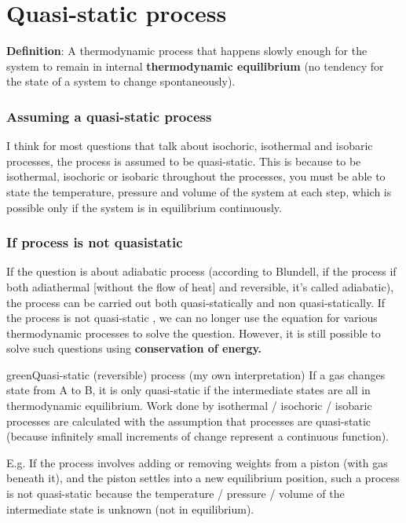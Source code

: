 \documentclass[12pt,a4paper]{extreport}
\numberwithin{equation}{chapter}
\begin{document}
    \section{Quasi-static process}
    \textbf{Definition}: A thermodynamic process that happens slowly enough for the system to remain in internal \textbf{thermodynamic equilibrium} (no tendency for the state of a system to change spontaneously).
        \subsubsection{Assuming a quasi-static process}
            I think for most questions that talk about isochoric, isothermal and isobaric processes, the process is assumed to be quasi-static. This is because to be isothermal, isochoric or isobaric throughout the processes, you must be able to state the temperature, pressure and volume of the system at each step, which is possible only if the system is in equilibrium continuously.
    
        \subsubsection{If process is not quasistatic}
    
            If the question is about adiabatic process (according to Blundell, if the process if both adiathermal [without the flow of heat] and reversible, it's called adiabatic), the process can be carried out both quasi-statically and non quasi-statically. If the process is not quasi-static , we can no longer use the equation for various thermodynamic processes to solve the question. However, it is still possible to solve such questions using \textbf{conservation of energy.}
    
            \begin{mybox}{green}{Quasi-static (reversible) process (my own interpretation)}
                If a gas changes state from A to B, it is only quasi-static if the intermediate states are all in thermodynamic equilibrium. Work done by isothermal / isochoric / isobaric processes are calculated with the assumption that processes are quasi-static (because infinitely small increments of change represent a continuous function).
     
                \begin{flushleft}
                E.g. If the process involves adding or removing weights from a piston (with gas beneath it), and the piston settles into a new equilibrium position, such a process is not quasi-static because the temperature / pressure / volume of the intermediate state is unknown (not in equilibrium).  
                \end{flushleft}
     
            \end{mybox}
        
\end{document}
